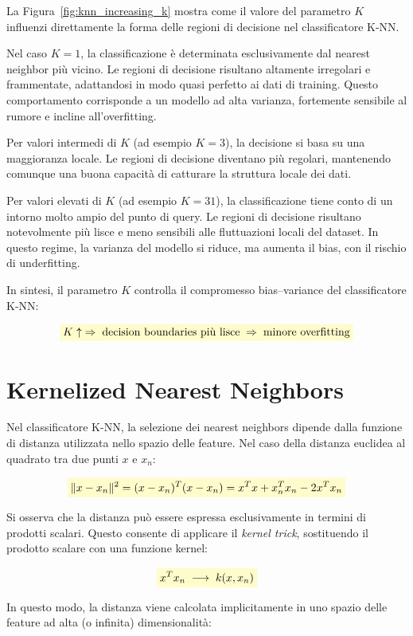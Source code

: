 \documentclass[a4paper,12pt]{report}
\newcommand{\highlight}[1]{%
\colorbox{yellow!20}{$\displaystyle #1$}%
}
\begin{document}
La Figura~\ref{fig:knn_increasing_k} mostra come il valore del parametro $K$ influenzi direttamente la forma delle regioni di decisione nel classificatore K-NN.

Nel caso $K=1$, la classificazione è determinata esclusivamente dal nearest neighbor più vicino.  
Le regioni di decisione risultano altamente irregolari e frammentate, adattandosi in modo quasi perfetto ai dati di training.  
Questo comportamento corrisponde a un modello ad alta varianza, fortemente sensibile al rumore e incline all’overfitting.

Per valori intermedi di $K$ (ad esempio $K=3$), la decisione si basa su una maggioranza locale.  
Le regioni di decisione diventano più regolari, mantenendo comunque una buona capacità di catturare la struttura locale dei dati.

Per valori elevati di $K$ (ad esempio $K=31$), la classificazione tiene conto di un intorno molto ampio del punto di query.  
Le regioni di decisione risultano notevolmente più lisce e meno sensibili alle fluttuazioni locali del dataset.  
In questo regime, la varianza del modello si riduce, ma aumenta il bias, con il rischio di underfitting.

In sintesi, il parametro $K$ controlla il compromesso bias–variance del classificatore K-NN:

\[
\highlight{
K \uparrow \;\Rightarrow\; \text{decision boundaries più lisce} \;\Rightarrow\; \text{minore overfitting}}
\]

\section{Kernelized Nearest Neighbors}

Nel classificatore K-NN, la selezione dei nearest neighbors dipende dalla funzione di distanza utilizzata nello spazio delle feature.  
Nel caso della distanza euclidea al quadrato tra due punti $x$ e $x_n$:

\[
\highlight{
\|x - x_n\|^2
= (x - x_n)^T (x - x_n)
= x^T x + x_n^T x_n - 2 x^T x_n}
\]

Si osserva che la distanza può essere espressa esclusivamente in termini di prodotti scalari.  
Questo consente di applicare il \emph{kernel trick}, sostituendo il prodotto scalare con una funzione kernel:

\[
\highlight{
x^T x_n \;\longrightarrow\; k(x, x_n)}
\]

In questo modo, la distanza viene calcolata implicitamente in uno spazio delle feature ad alta (o infinita) dimensionalità:
\end{document}
